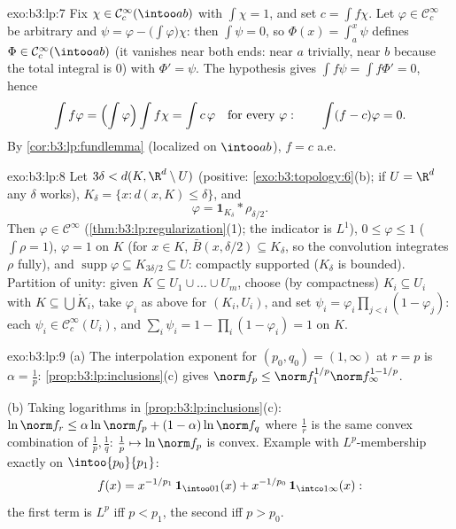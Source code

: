 \begin{solution}{exo:b3:lp:7}
Fix $\chi \in \mathcal C_c^\infty(\intoo ab)$ with $\int\chi =
1$, and set $c = \int f\chi$. Let $\varphi \in \mathcal
C_c^\infty$ be arbitrary and $\psi = \varphi -
\bigl(\int\varphi\bigr)\chi$: then $\int\psi = 0$, so $\Phi(x)
= \int_a^x\psi$ defines $\Phi \in \mathcal C_c^\infty(\intoo
ab)$ (it vanishes near both ends: near $a$ trivially, near $b$
because the total integral is $0$) with $\Phi' = \psi$. The
hypothesis gives $\int f\psi = \int f\Phi' = 0$, hence
\[
\int f\varphi = \Bigl(\int\varphi\Bigr)\int f\chi = \int
c\,\varphi
\quad\text{for every } \varphi:
\qquad \int(f - c)\varphi = 0 .
\]
By \cref{cor:b3:lp:fundlemma} (localized on $\intoo ab$), $f =
c$ a.e.
\end{solution}

\begin{solution}{exo:b3:lp:8}
Let $3\delta < d(K, \R^d\setminus U)$ (positive:
\cref{exo:b3:topology:6}(b); if $U = \R^d$ any $\delta$
works), $K_\delta = \{x : d(x, K) \leq \delta\}$, and
\[
\varphi = \mathbf 1_{K_\delta} * \rho_{\delta/2} .
\]
Then $\varphi \in \mathcal C^\infty$
(\cref{thm:b3:lp:regularization}(1); the indicator is $L^1$),
$0 \leq \varphi \leq 1$ ($\int\rho = 1$), $\varphi = 1$ on $K$
(for $x \in K$, $\bar B(x, \delta/2) \subseteq K_\delta$, so
the convolution integrates $\rho$ fully), and
$\operatorname{supp}\varphi \subseteq K_{3\delta/2} \subseteq
U$: compactly supported ($K_\delta$ is bounded). Partition of
unity: given $K \subseteq U_1\cup\dots\cup U_m$, choose (by
compactness)  $K_i \subseteq U_i$ with $K \subseteq
\bigcup \mathring K_i$, take $\varphi_i$ as above for $(K_i,
U_i)$, and set $\psi_i = \varphi_i\prod_{j <i}(1 -
\varphi_j)$: each $\psi_i \in \mathcal C_c^\infty(U_i)$, and
$\sum_i\psi_i = 1 - \prod_i(1 - \varphi_i) = 1$ on $K$.
\end{solution}

\begin{solution}{exo:b3:lp:9}
(a) The interpolation exponent for $(p_0, q_0) = (1, \infty)$
at $r = p$ is $\alpha = \frac1p$:
\cref{prop:b3:lp:inclusions}(c) gives $\norm f_p \leq \norm
f_1^{1/p}\norm f_\infty^{1 - 1/p}$.

(b) Taking logarithms in
\cref{prop:b3:lp:inclusions}(c): $\ln\norm f_r \leq
\alpha\ln\norm f_p + (1-\alpha)\ln\norm f_q$ where $\frac1r$
is the same convex combination of $\frac1p, \frac1q$: $\frac1p
\mapsto \ln\norm f_p$ is convex. Example with $L^p$-membership
exactly on $\intoo{p_0}{p_1}$:
\[
f(x) = x^{-1/p_1}\,\mathbf 1_{\intoo01}(x) +
x^{-1/p_0}\,\mathbf 1_{\intco1\infty}(x):
\]
the first term is $L^p$ iff $p < p_1$, the second iff $p >
p_0$.
\end{solution}

